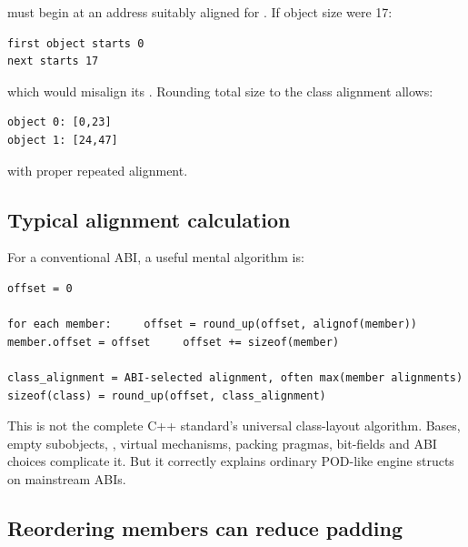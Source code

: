 must begin at an address suitably aligned for . If object size were 17:

\begin{verbatim}
first object starts 0
next starts 17
\end{verbatim}

which would misalign its . Rounding total size to the class alignment allows:

\begin{verbatim}
object 0: [0,23]
object 1: [24,47]
\end{verbatim}

with proper repeated alignment.

\subsection{Typical alignment calculation}\label{01-foundations-i-ch003-typical-alignment-calculation}

\hypertarget{01-foundations-i-ch003-typical-alignment-calculation}{}

For a conventional ABI, a useful mental algorithm is:

\begin{verbatim}
offset = 0

for each member:     offset = round_up(offset, alignof(member))     member.offset = offset     offset += sizeof(member)

class_alignment = ABI-selected alignment, often max(member alignments)
sizeof(class) = round_up(offset, class_alignment)
\end{verbatim}

This is not the complete C++ standard's universal class-layout algorithm. Bases, empty subobjects, , virtual mechanisms, packing pragmas, bit-fields and ABI choices complicate it. But it correctly explains ordinary POD-like engine structs on mainstream ABIs.

\subsection{Reordering members can reduce padding}\label{01-foundations-i-ch003-reordering-members-can-reduce-padding}

\hypertarget{01-foundations-i-ch003-reordering-members-can-reduce-padding}{}

